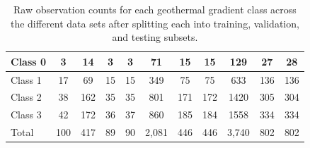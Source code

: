 \begin{table}[!htp]
{\begin{tabular}{l|c|c|c|c|c|c|c|c|c|c|}
    \multicolumn{1}{|l|}{Class 0} & 3 & 14 & 3 & 3 & 71 & 15 & 15 & 129 & 27 & 28  \\ \hline
    \multicolumn{1}{|l|}{Class 1} & 17 & 69 & 15 & 15 & 349 & 75 & 75 & 633 & 136 & 136 \\ \hline
    \multicolumn{1}{|l|}{Class 2} & 38 & 162 & 35 & 35 & 801 & 171 & 172 & 1420 & 305 & 304 \\ \hline
    \multicolumn{1}{|l|}{Class 3} & 42 & 172 & 36 & 37 & 860 & 185 & 184 & 1558 & 334 & 334 \\ \hline
    \multicolumn{1}{|l|}{Total}   & 100 & 417 & 89 & 90 & 2,081 & 446 & 446 & 3,740 & 802 & 802 \\ \hline
    \end{tabular}}
\caption[Class count for test-train-validate split]{Raw observation counts for each geothermal gradient class across the different data sets after splitting each into training, validation, and testing subsets.}
\label{tab:stratified_split_counts}
\end{table}